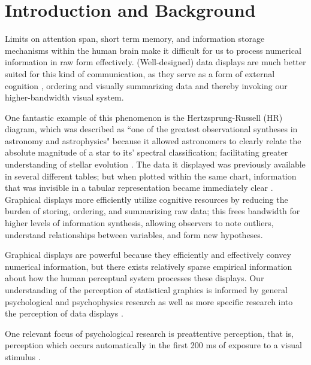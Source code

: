 \documentclass[12pt]{article}\usepackage[]{graphicx}\usepackage[]{color}
\begin{document}
\tableofcontents
\newpage
\section{Introduction and Background}
Limits on attention span, short term memory, and information storage mechanisms within the human brain make it difficult for us to process numerical information  in raw form effectively. 
(Well-designed) data displays are much better suited for this kind of communication, as  they serve as a form of external cognition \citep{zhang1997nature,scaife1996external}, ordering and visually summarizing data
and thereby invoking our higher-bandwidth visual system. 

One fantastic example of this phenomenon is the Hertzsprung-Russell (HR) diagram, which was described as ``one of the greatest observational syntheses in astronomy and astrophysics" because it allowed astronomers to clearly relate the absolute magnitude of a star to its' spectral classification; facilitating greater understanding of stellar evolution \citep{spence1993remarkable}. 
The data it displayed was previously available in several different tables; but when plotted within the same chart, information that was invisible in a tabular representation became immediately clear \citep{lewandowsky1989perception}. 
Graphical displays more efficiently utilize cognitive resources by reducing the burden of storing, ordering, and summarizing raw data; this frees bandwidth for higher levels of information synthesis, allowing observers to note outliers, understand relationships between variables, and form new hypotheses.

Graphical displays are powerful because they efficiently and effectively convey numerical information, but there exists  relatively sparse empirical information about how the human perceptual system processes these displays. Our understanding of the perception of statistical graphics is informed by general psychological and psychophysics research as well as more specific research into the perception of data displays \citep{cleveland:1984}. 

One relevant focus of psychological research is preattentive perception, that is, perception which occurs automatically in the first 200 ms of exposure to a visual stimulus \citep{treisman1985preattentive}. 
\end{document}

